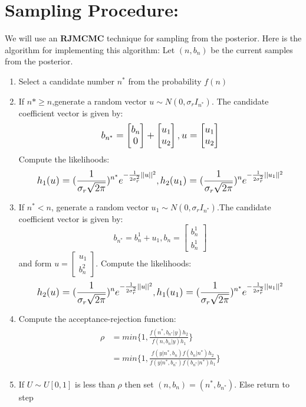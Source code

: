 \documentclass[12pt,a4paper]{article}
\begin{document}
\section{Sampling Procedure:}
We will use an \textbf{RJMCMC} technique for sampling from the posterior. Here is the algorithm for implementing this algorithm: Let $(n, b_n)$ be the current samples from the posterior.
\begin{enumerate}
    \item Select a candidate number $n^*$ from the probability $f(n)$
    \item If $n*\geq n$,generate a random vector $u \sim N(0,\sigma_rI_{n^*})$. The candidate coefficient vector is given by:
  $$\mathlarger{ b_{n^*} =\begin{bmatrix}
     b_n\\
     0
     \end{bmatrix}
     +
     \begin{bmatrix}
     u_1
     \\
     u_2
     \end{bmatrix},
     u=\begin{bmatrix}
     u_1\\
     u_2
     \end{bmatrix}}
     $$
Compute the likelihoods:
     $$\mathlarger{h_1(u)=(\frac{1}{\sigma_r\sqrt{2\pi}})^{n^*}e^{-\frac{1}{2\sigma_r^2}||u||^2}},
       \mathlarger{h_2(u_1)=(\frac{1}{\sigma_r\sqrt{2\pi}})^{n}e^{-\frac{1}{2\sigma_r^2}||u_1||^2}}$$
    \item If $n^*<n$, generate a random vector $u_1 \sim N(0,\sigma_rI_{n^*})$.The candidate coefficient vector is given by:
    $$b_{n^*}=b_{n}^1+u_1 , b_n=\begin{bmatrix}
    b_{n}^{1}\\
    b_{n}^{1}
    \end{bmatrix}$$
    and form $u=\begin{bmatrix}
    u_1\\
    b_{n}^2
    \end{bmatrix}$.
\newline    
Compute the likelihoods:    
    $$\mathlarger{h_2(u)=(\frac{1}{\sigma_r\sqrt{2\pi}})^{n}e^{-\frac{1}{2\sigma_r^2}||u||^2}},
   \mathlarger{h_1(u_1)=(\frac{1}{\sigma_r\sqrt{2\pi}})^{n^*}e^{-\frac{1}{2\sigma_r^2}||u_1||^2}}$$
   
   \item Compute the acceptance-rejection function:
   \begin{align}
   \begin{split}
   \rho& = min \bigg\{1,\frac{f(n^*,b_{n^*}|y)h_2}{f(n,b_{n}|y)h_1}\bigg\}\\
    &= min \bigg\{1,\frac{f(y|n^*,b_{n})f(b_{n}|n^*)h_2}{f(y|n^*,b_{n^*})f(b_{n^*}|n^*)h_1}\bigg\}
 \end{split}
 \end{align}
 \item If $U \sim U[0,1]$ is less than $\rho$ then set $(n,b_n)=(n^*,b_{n^*})$. Else return to step 
\end{enumerate}
\end{document}
